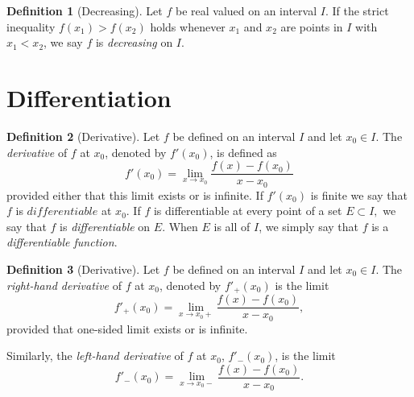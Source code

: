 \documentclass[11pt]{article}
\def \limitToXZero {\lim_{x \to x_0}}
\theoremstyle{definition}
\newtheorem{definition}{Definition}[section]
\begin{document}
\begin{definition} [Decreasing]
	Let $ f $ be real valued on an interval $ I $. If the strict inequality $ f(x_1) > f(x_2) $ holds whenever $ x_1 $ and $ x_2 $ are points in $ I $ with $ x_1 < x_2 $, we say $ f $ is \textit{decreasing} on $ I $.
\end{definition}


\setcounter{section}{6}
\section{Differentiation}

\begin{definition} [Derivative]
	Let $ f $ be defined on an interval $ I $ and let $ x_0 \in I. $ The \textit{derivative} of $ f $ at $ x_0 $, denoted by $ f'(x_0) $, is defined as
	$$ f'(x_0) = \limitToXZero \frac{f(x) - f(x_0)}{x - x_0} $$ provided either that this limit exists or is infinite. If $f'(x_0)$ is finite we say that $ f $ is $ differentiable $ at $ x_0 $. If $ f $ is differentiable at every point of a set $ E \subset I, $ we say that $ f $ is \textit{differentiable} on $ E $. When $ E $ is all of $ I $, we simply say that $ f $ is a \textit{differentiable function}.
\end{definition}

\begin{definition} [Derivative]
	Let $ f $ be defined on an interval $ I $ and let $ x_0 \in I$. The \textit{right-hand derivative} of $ f $ at $ x_0 $,	denoted by $ f'_+(x_0) $ is the limit
		$$ f'_+(x_0) = \lim_{x \to x_0+} \frac{f(x) - f(x_0)}{x - x_0},$$
	provided that one-sided limit exists or is infinite. 
	
	Similarly, the \textit{left-hand derivative} of $ f $ at $ x_0 $, $ f'_-(x_0)$, is
	the limit 
		$$f'_-(x_0) = \lim_{x \to x_0-} \frac{f(x) - f(x_0)}{x - x_0}.$$

\end{definition}
\end{document}
